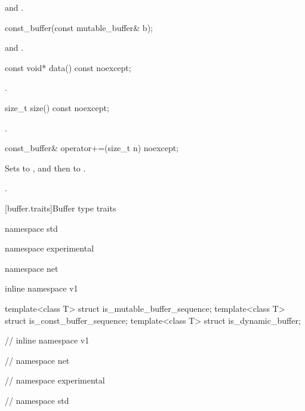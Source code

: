 \begin{itemdescr}
\pnum
\postconditions {} and .
\end{itemdescr}

%
\begin{itemdecl}
const_buffer(const mutable_buffer& b);
\end{itemdecl}

\begin{itemdescr}
\pnum
\postconditions {} and .
\end{itemdescr}

%
\begin{itemdecl}
const void* data() const noexcept;
\end{itemdecl}

\begin{itemdescr}
\pnum
\returns {}.
\end{itemdescr}

%
\begin{itemdecl}
size_t size() const noexcept;
\end{itemdecl}

\begin{itemdescr}
\pnum
\returns {}.
\end{itemdescr}

%
\begin{itemdecl}
const_buffer& operator+=(size_t n) noexcept;
\end{itemdecl}

\begin{itemdescr}
\pnum
\effects Sets  to , and then  to .

\pnum
\returns {}.
\end{itemdescr}


[buffer.traits]{Buffer type traits}

%
%
%
\begin{codeblock}
namespace std {
namespace experimental {
namespace net {
inline namespace v1 {

  template<class T> struct is_mutable_buffer_sequence;
  template<class T> struct is_const_buffer_sequence;
  template<class T> struct is_dynamic_buffer;

} // inline namespace v1
} // namespace net
} // namespace experimental
} // namespace std
\end{codeblock}

